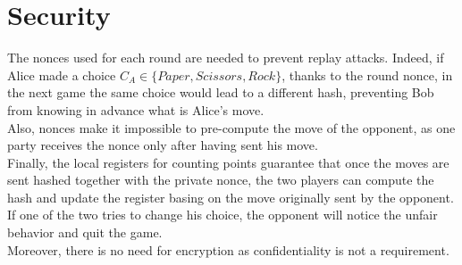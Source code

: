 \documentclass[11 pt]{article}
\begin{document}
\section{Security}
The nonces used for each round are needed to prevent replay attacks. Indeed, if Alice made a choice $C_A \in \{Paper, Scissors, Rock\}$, thanks to the round nonce, in the next game the same choice would lead to a different hash, preventing Bob from knowing in advance what is Alice's move.\\
Also, nonces make it impossible to pre-compute the move of the opponent, as one party receives the nonce only after having sent his move.\\
Finally, the local registers for counting points guarantee that once the moves are sent hashed together with the private nonce, the two players can compute the hash and update the register basing on the move originally sent by the opponent. If one of the two tries to change his choice, the opponent will notice the unfair behavior and quit the game. \\
Moreover, there is no need for encryption as confidentiality is not a requirement.
\end{document}
